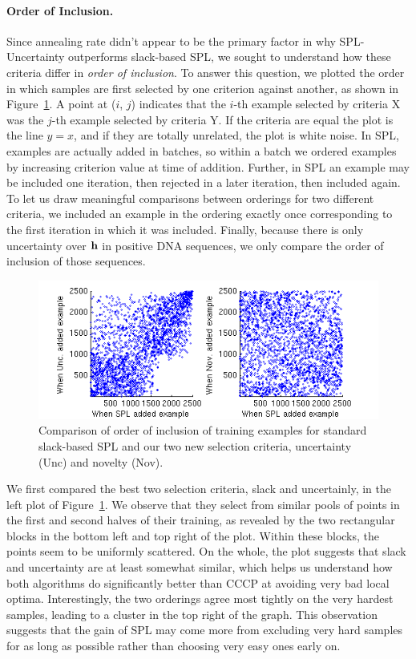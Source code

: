 \documentclass{article}
\newcommand{\myparagraph}[1]{\vspace{-2mm}\paragraph{#1}}
\begin{document}
\myparagraph{Order of Inclusion.} Since annealing rate didn't appear to be the primary factor in why SPL-Uncertainty outperforms slack-based SPL, we sought to understand how these criteria differ in \emph{order of inclusion}. To answer this question, we plotted the order in which samples are first selected by one criterion against another, as shown in Figure~\ref{fig:order}. A point at ($i$, $j$) indicates that the $i$-th example selected by criteria {\sc X} was the $j$-th example selected by criteria {\sc Y}.  If the criteria are equal the plot is the line $y=x$, and if they are totally unrelated, the plot is white noise.  In SPL, examples are actually added in batches, so within a batch we ordered examples by increasing criterion value at time of addition.  Further, in SPL an example may be included one iteration, then rejected in a later iteration, then included again.  To let us draw meaningful comparisons between orderings for two different criteria, we included an example in the ordering exactly once corresponding to the first iteration in which it was included.  Finally, because there is only uncertainty over $\bf h$ in positive DNA sequences, we only compare the order of inclusion of those sequences.

\begin{figure}
\includegraphics{ordercomp.png}
\caption{Comparison of order of inclusion of training examples for standard slack-based SPL and our two new selection criteria, uncertainty (Unc) and novelty (Nov).}
\label{fig:order}
\end{figure}

We first compared the best two selection criteria, slack and uncertainly, in the left plot of Figure~\ref{fig:order}.  We observe that they select from similar pools of points in the first and second halves of their training, as revealed by the two rectangular blocks in the bottom left and top right of the plot. Within these blocks, the points seem to be uniformly scattered. On the whole, the plot suggests that slack and uncertainty are at least somewhat similar, which helps us understand how both algorithms do significantly better than {\sc CCCP} at avoiding very bad local optima.  Interestingly, the two orderings agree most tightly on the very hardest samples, leading to a cluster in the top right of the graph.  This observation suggests that the gain of SPL may come more from excluding very hard samples for as long as possible rather than choosing very easy ones early on.
\end{document}
